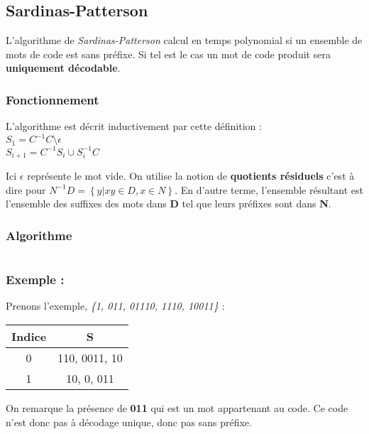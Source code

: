 \subsection{Sardinas-Patterson}

\par L'algorithme de \textit{Sardinas-Patterson} calcul en temps polynomial si un ensemble de mots de code est sans préfixe. Si tel est le cas un mot de code produit sera \textbf{uniquement décodable}.




\subsubsection{Fonctionnement}
\par L'algorithme est décrit inductivement par cette définition : \\
 $ S_1 = C^{-1}C  \setminus \epsilon$ \\
$S_{i+1} = C^{-1}S_i\cup S_i^{-1}C$
\par Ici $\epsilon$ représente le mot vide. On utilise la notion de \textbf{quotients résiduels} c'est à dire pour $N^{-1}D = \left\{ y | xy \in D, x \in N \right\} $. En d'autre terme, l'ensemble résultant est l'ensemble des suffixes des mots dans \textbf{D} tel que leurs préfixes sont dans \textbf{N}.

\subsubsection{Algorithme}
\begin{verbatim}

\end{verbatim}

\subsubsection{Exemple :}
\par Prenons l'exemple, \textit{\{1, 011, 01110, 1110, 10011\}} : \\ 

\begin{tabular}{|c|c|}
    \hline
    Indice & S \\
    \hline
    0 & 110, 0011, 10\\
    \hline
    1 & 10, 0, 011\\
    \hline
\end{tabular}

\par On remarque la présence de \textbf{011} qui est un mot appartenant au code. Ce code n'est donc pas à décodage unique, donc pas sans préfixe. 
